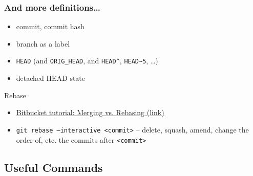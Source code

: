 \documentclass{beamer}
\begin{document}
    \begin{frame}
        \frametitle{And more definitions\dots}
        \begin{itemize}
            \item commit, commit hash
            \item branch as a label
            \item \texttt{HEAD} (and \texttt{ORIG\_HEAD}, and \texttt{HEAD\^}, \texttt{HEAD\textasciitilde5}, \dots)
            \item detached HEAD state
        \end{itemize}

    \end{frame}


    \begin{frame}{Rebase}

        \begin{itemize}
            \item \href{https://www.atlassian.com/git/tutorials/merging-vs-rebasing}{Bitbucket tutorial: Merging vs. Rebasing (link)}
            \item \texttt{git rebase --interactive <commit>} -- delete, squash, amend, change the order of, etc. the commits after \texttt{<commit>}
        \end{itemize}

    \end{frame}




    \subsection{Useful Commands}
\end{document}
